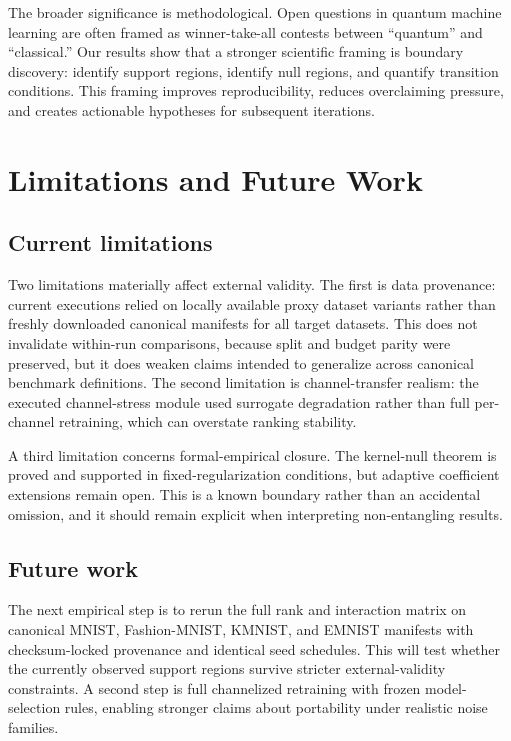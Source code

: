 The broader significance is methodological. Open questions in quantum machine learning are often framed as winner-take-all contests between ``quantum'' and ``classical.'' Our results show that a stronger scientific framing is boundary discovery: identify support regions, identify null regions, and quantify transition conditions. This framing improves reproducibility, reduces overclaiming pressure, and creates actionable hypotheses for subsequent iterations.

\section{Limitations and Future Work}\label{sec:limitations}
\subsection{Current limitations}
Two limitations materially affect external validity. The first is data provenance: current executions relied on locally available proxy dataset variants rather than freshly downloaded canonical manifests for all target datasets. This does not invalidate within-run comparisons, because split and budget parity were preserved, but it does weaken claims intended to generalize across canonical benchmark definitions. The second limitation is channel-transfer realism: the executed channel-stress module used surrogate degradation rather than full per-channel retraining, which can overstate ranking stability.

A third limitation concerns formal-empirical closure. The kernel-null theorem is proved and supported in fixed-regularization conditions, but adaptive coefficient extensions remain open. This is a known boundary rather than an accidental omission, and it should remain explicit when interpreting non-entangling results.

\subsection{Future work}
The next empirical step is to rerun the full rank and interaction matrix on canonical MNIST, Fashion-MNIST, KMNIST, and EMNIST manifests with checksum-locked provenance and identical seed schedules. This will test whether the currently observed support regions survive stricter external-validity constraints. A second step is full channelized retraining with frozen model-selection rules, enabling stronger claims about portability under realistic noise families.

